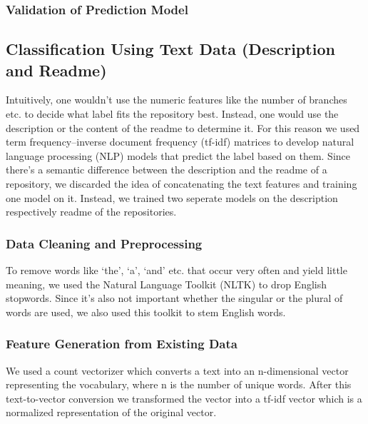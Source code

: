 \documentclass[%
a4paper,
DIV12,
2.5headlines,
bigheadings,
titlepage,
openbib,
]{scrartcl}
\begin{document}
\subsubsection{Validation of Prediction
Model}\label{validation-of-prediction-model}


\subsection{Classification Using Text Data (Description and
Readme)}\label{classification-using-text-data-description-and-readme}

Intuitively, one wouldn't use the numeric features like the number of branches etc. to decide what label fits the repository best.
Instead, one would use the description or the content of the readme to determine it.
For this reason we used term frequency--inverse document frequency (tf-idf) matrices to develop natural language processing (NLP) models that predict the label based on them.
Since there's a semantic difference between the description and the readme of a repository, we discarded the idea of concatenating the text features and training one model on it.
Instead, we trained two seperate models on the description respectively readme of the repositories.

\subsubsection{Data Cleaning and
Preprocessing}\label{data-cleaning-and-preprocessing-1}

To remove words like `the', `a', `and' etc. that occur very often and yield little meaning, we used the Natural Language Toolkit (NLTK) to drop English stopwords.
Since it's also not important whether the singular or the plural of words are used, we also used this toolkit to stem English words.

\subsubsection{Feature Generation from Existing
Data}\label{feature-generation-from-existing-data}

We used a count vectorizer which converts a text into an n-dimensional vector representing the vocabulary, where n is the number of unique words.
After this text-to-vector conversion we transformed the vector into a tf-idf vector which is a normalized representation of the original vector.
\end{document}
